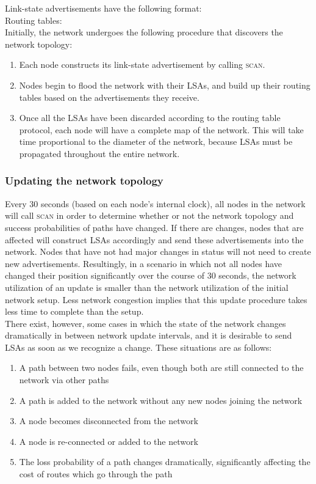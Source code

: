 \documentclass[letterpaper]{article}
\begin{document}
\noindent Link-state advertisements have the following format:
\\

\noindent Routing tables:
\\

\noindent Initially, the network undergoes the following procedure that discovers the network topology:

\begin{enumerate}
  \item Each node constructs its link-state advertisement by calling \textsc{scan}. 
  \item Nodes begin to flood the network with their LSAs, and build up their routing tables based on
  the advertisements they receive.
  \item Once all the LSAs have been discarded according to the routing table protocol, each node will have
  a complete map of the network. This will take time proportional to the diameter of the network, because
  LSAs must be propagated throughout the entire network.
\end{enumerate}

\subsubsection{Updating the network topology}

Every 30 seconds (based on each node's internal clock), all nodes in the network will call \textsc{scan} in
order to determine whether or not the network topology and success probabilities of paths have changed.
If there are changes, nodes that are affected will construct LSAs accordingly and send these
advertisements into the network. Nodes that have not had major changes in status will not need to create
new advertisements. Resultingly, in a scenario in which not all nodes have changed their position
significantly over the course of 30 seconds, the network utilization of an update is smaller than the
network utilization of the initial network setup. Less network congestion implies that this update
procedure takes less time to complete than the setup.
\\

\noindent There exist, however, some cases in which the state of the network changes dramatically in 
between network update intervals, and it is desirable to send LSAs as soon as we recognize a change.
These situations are as follows:

\begin{enumerate}
  \item A path between two nodes fails, even though both are still connected to the network via other
  paths
  \item A path is added to the network without any new nodes joining the network
  \item A node becomes disconnected from the network
  \item A node is re-connected or added to the network
  \item The loss probability of a path changes dramatically, significantly affecting the cost of
  routes which go through the path
\end{enumerate}
\end{document}
